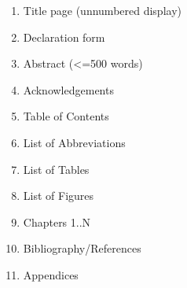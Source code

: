 \begin{enumerate}
  \item Title page (unnumbered display)
  \item Declaration form
  \item Abstract (<=500 words)
  \item Acknowledgements
  \item Table of Contents
  \item List of Abbreviations
  \item List of Tables
  \item List of Figures
  \item Chapters 1..N
  \item Bibliography/References
  \item Appendices
\end{enumerate}
